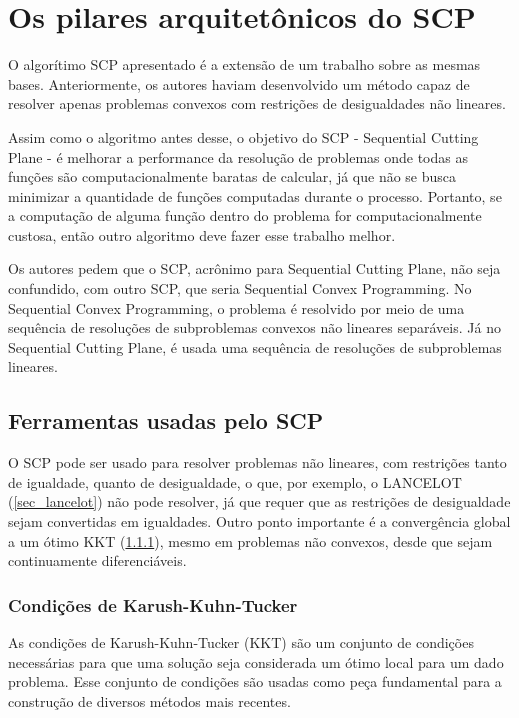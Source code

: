 \section{Os pilares arquitetônicos do SCP}

\noindent
O algorítimo SCP \cite{Still2010} apresentado é a extensão de um trabalho sobre as
mesmas bases. Anteriormente, os autores haviam desenvolvido um método capaz de resolver apenas
problemas convexos com restrições de desigualdades não lineares.

Assim como o algoritmo antes desse, o objetivo do SCP - Sequential Cutting Plane - é melhorar
a performance da resolução de problemas onde todas as funções são computacionalmente baratas
de calcular, já que não se busca minimizar a quantidade de funções computadas durante o processo.
Portanto, se a computação de alguma função dentro do problema for computacionalmente custosa, então outro
algoritmo deve fazer esse trabalho melhor.

Os autores pedem que o SCP, acrônimo para Sequential Cutting Plane, não seja confundido, com
outro SCP, que seria Sequential Convex Programming. No Sequential Convex Programming, o problema é
resolvido por meio de uma sequência de resoluções de subproblemas convexos não lineares
separáveis. Já no Sequential Cutting Plane, é usada uma sequência de resoluções de subproblemas
lineares.

\subsection{Ferramentas usadas pelo SCP}

\noindent
O SCP \cite{Still2010} pode ser usado para resolver problemas não lineares, com restrições tanto
de igualdade, quanto de desigualdade, o que, por exemplo, o LANCELOT (\ref{sec_lancelot}) não pode
resolver, já que requer que as restrições de desigualdade sejam convertidas em igualdades. Outro
ponto importante é a convergência global a um ótimo KKT (\ref{sec_kkt}), mesmo em problemas não convexos, desde
que sejam continuamente diferenciáveis.

\subsubsection{Condições de Karush-Kuhn-Tucker}
\label{sec_kkt}

\noindent
As condições de Karush-Kuhn-Tucker (KKT) são um conjunto de condições necessárias para
que uma solução seja considerada um ótimo local para um dado problema. Esse conjunto
de condições são usadas como peça fundamental para a construção de diversos métodos mais
recentes.

